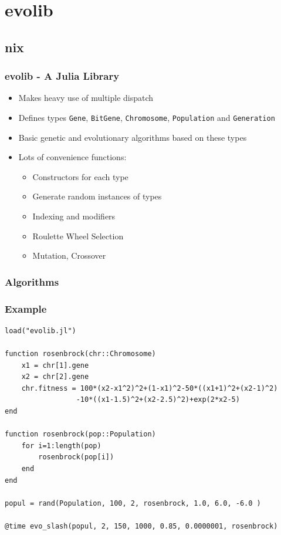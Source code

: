 \documentclass[%
14pt
]{beamer}
\begin{document}
\section{evolib}
\subsection{nix}
\begin{frame}
  \frametitle{evolib - A Julia Library}
  \begin{itemize}
    \item Makes heavy use of multiple dispatch
    \item Defines types \texttt{Gene}, \texttt{BitGene}, \texttt{Chromosome}, \texttt{Population} and \texttt{Generation}
    \item Basic genetic and evolutionary algorithms based on these types
    \item Lots of convenience functions:
      \begin{itemize}
        \item Constructors for each type
        \item Generate random instances of types
        \item Indexing and modifiers
        \item Roulette Wheel Selection
        \item Mutation, Crossover
      \end{itemize}
  \end{itemize}
\end{frame}

\begin{frame}
  \frametitle{Algorithms}
\end{frame}

\begin{frame}[fragile]
  \frametitle{Example}
  \vspace{-0.8cm}
{\scriptsize
\begin{verbatim}
load("evolib.jl")

function rosenbrock(chr::Chromosome)
    x1 = chr[1].gene
    x2 = chr[2].gene
    chr.fitness = 100*(x2-x1^2)^2+(1-x1)^2-50*((x1+1)^2+(x2-1)^2)
                 -10*((x1-1.5)^2+(x2-2.5)^2)+exp(2*x2-5)
end

function rosenbrock(pop::Population)
    for i=1:length(pop)
        rosenbrock(pop[i])
    end
end

popul = rand(Population, 100, 2, rosenbrock, 1.0, 6.0, -6.0 )

@time evo_slash(popul, 2, 150, 1000, 0.85, 0.0000001, rosenbrock)

\end{verbatim}}
\end{frame}
\end{document}
